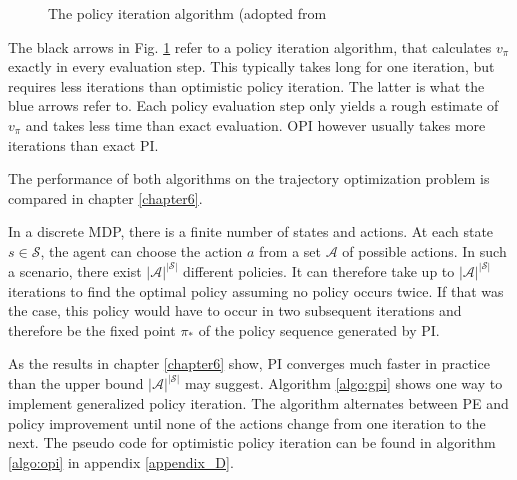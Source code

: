 \begin{figure}[htb]
	\caption{The policy iteration algorithm (adopted from~\cite[section~4.6]{SuttonBarto2018}}
	\label{fig:PI_triangle}
\end{figure}

The black arrows in Fig. \ref{fig:PI_triangle} refer to a policy iteration algorithm, that calculates $v_\pi$ exactly in every evaluation step. This typically takes long for one iteration, but requires less iterations than optimistic policy iteration. The latter is what the blue arrows refer to. Each policy evaluation step only yields a rough estimate of $v_\pi$ and takes less time than exact evaluation. OPI however usually takes more iterations than exact PI.

The performance of both algorithms on the trajectory optimization problem is compared in chapter \ref{chapter6}. \bigbreak

In a discrete MDP, there is a finite number of states and actions. At each state $s \in \mathcal{S}$, the agent can choose the action $a$ from a set $\mathcal{A}$ of possible actions. In such a scenario, there exist $|\mathcal{A}|^{|\mathcal{S}|}$ different policies. It can therefore take up to $|\mathcal{A}|^{|\mathcal{S}|}$ iterations to find the optimal policy assuming no policy occurs twice. If that was the case, this policy would have to occur in two subsequent iterations and therefore be the fixed point $\pi_*$ of the policy sequence generated by PI.

As the results in chapter \ref{chapter6} show, PI converges much faster in practice than the upper bound $|\mathcal{A}|^{|\mathcal{S}|}$ may suggest. Algorithm \ref{algo:gpi} shows one way to implement generalized policy iteration. The algorithm alternates between PE and policy improvement until none of the actions change from one iteration to the next. The pseudo code for optimistic policy iteration can be found in algorithm \ref{algo:opi} in appendix \ref{appendix_D}.

